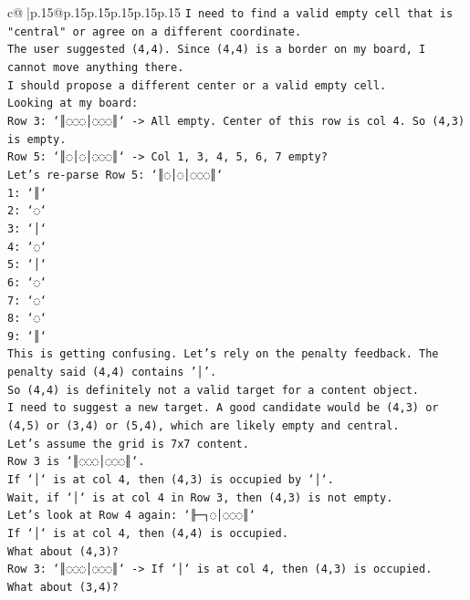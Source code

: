 \documentclass{article}
\begin{document}
{\begin{supertabular}{c@{$\;$}|p{.15\linewidth}@{}p{.15\linewidth}p{.15\linewidth}p{.15\linewidth}p{.15\linewidth}p{.15\linewidth}}
{{{\texttt{I need to find a valid empty cell that is "central" or agree on a different coordinate.} \\
\texttt{The user suggested (4,4). Since (4,4) is a border on my board, I cannot move anything there.} \\
\texttt{I should propose a different center or a valid empty cell.} \\
\texttt{Looking at my board:} \\
\texttt{Row 3: `║◌◌◌│◌◌◌║` {-}> All empty. Center of this row is col 4. So (4,3) is empty.} \\
\texttt{Row 5: `║◌│◌│◌◌◌║` {-}> Col 1, 3, 4, 5, 6, 7 empty?} \\
\texttt{Let's re{-}parse Row 5: `║◌│◌│◌◌◌║`} \\
\texttt{1: `║`} \\
\texttt{2: `◌`} \\
\texttt{3: `│`} \\
\texttt{4: `◌`} \\
\texttt{5: `│`} \\
\texttt{6: `◌`} \\
\texttt{7: `◌`} \\
\texttt{8: `◌`} \\
\texttt{9: `║`} \\
\texttt{This is getting confusing. Let's rely on the penalty feedback. The penalty said (4,4) contains '│'.} \\
\texttt{So (4,4) is definitely not a valid target for a content object.} \\
\texttt{I need to suggest a new target. A good candidate would be (4,3) or (4,5) or (3,4) or (5,4), which are likely empty and central.} \\
\texttt{Let's assume the grid is 7x7 content.} \\
\texttt{Row 3 is `║◌◌◌│◌◌◌║`.} \\
\texttt{If `│` is at col 4, then (4,3) is occupied by `│`.} \\
\texttt{Wait, if `│` is at col 4 in Row 3, then (4,3) is not empty.} \\
\texttt{Let's look at Row 4 again: `╟─┐◌│◌◌◌║`} \\
\texttt{If `│` is at col 4, then (4,4) is occupied.} \\
\texttt{What about (4,3)?} \\
\texttt{Row 3: `║◌◌◌│◌◌◌║` {-}> If `│` is at col 4, then (4,3) is occupied.} \\
\texttt{What about (3,4)?} \\
}}}
\end{supertabular}}
\end{document}
